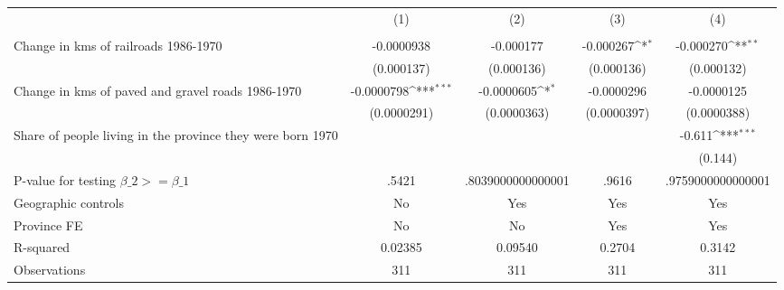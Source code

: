 {
\def\sym#1{\ifmmode^{#1}\else\(^{#1}\)\fi}
\begin{tabular}{l*{4}{c}}
\hline\hline
                &\multicolumn{1}{c}{(1)}&\multicolumn{1}{c}{(2)}&\multicolumn{1}{c}{(3)}&\multicolumn{1}{c}{(4)}\\
                &\multicolumn{1}{c}{}&\multicolumn{1}{c}{}&\multicolumn{1}{c}{}&\multicolumn{1}{c}{}\\
\hline
Change in kms of railroads 1986-1970&-0.0000938         &-0.000177         &-0.000267\sym{*}  &-0.000270\sym{**} \\
                &(0.000137)         &(0.000136)         &(0.000136)         &(0.000132)         \\
[1em]
Change in kms of paved and gravel roads 1986-1970&-0.0000798\sym{***}&-0.0000605\sym{*}  &-0.0000296         &-0.0000125         \\
                &(0.0000291)         &(0.0000363)         &(0.0000397)         &(0.0000388)         \\
[1em]
Share of people living in the province they were born 1970&                  &                  &                  &   -0.611\sym{***}\\
                &                  &                  &                  &  (0.144)         \\
\hline
P-value for testing $\beta\_{2} >= \beta\_{1}$&    .5421         &.8039000000000001         &    .9616         &.9759000000000001         \\
Geographic controls&       No         &      Yes         &      Yes         &      Yes         \\
Province FE     &       No         &       No         &      Yes         &      Yes         \\
R-squared       &  0.02385         &  0.09540         &   0.2704         &   0.3142         \\
Observations    &      311         &      311         &      311         &      311         \\
\hline\hline
\end{tabular}
}
